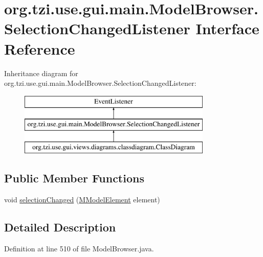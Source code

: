 \hypertarget{interfaceorg_1_1tzi_1_1use_1_1gui_1_1main_1_1_model_browser_1_1_selection_changed_listener}{\section{org.\-tzi.\-use.\-gui.\-main.\-Model\-Browser.\-Selection\-Changed\-Listener Interface Reference}
\label{interfaceorg_1_1tzi_1_1use_1_1gui_1_1main_1_1_model_browser_1_1_selection_changed_listener}
}
Inheritance diagram for org.\-tzi.\-use.\-gui.\-main.\-Model\-Browser.\-Selection\-Changed\-Listener\-:\begin{figure}[H]
\begin{center}
\leavevmode
\includegraphics[height=3.000000cm]{interfaceorg_1_1tzi_1_1use_1_1gui_1_1main_1_1_model_browser_1_1_selection_changed_listener}
\end{center}
\end{figure}
\subsection*{Public Member Functions}
\begin{DoxyCompactItemize}
\item 
void \hyperlink{interfaceorg_1_1tzi_1_1use_1_1gui_1_1main_1_1_model_browser_1_1_selection_changed_listener_a3ae90859474c029367b18ccb555adc14}{selection\-Changed} (\hyperlink{interfaceorg_1_1tzi_1_1use_1_1uml_1_1mm_1_1_m_model_element}{M\-Model\-Element} element)
\end{DoxyCompactItemize}


\subsection{Detailed Description}


Definition at line 510 of file Model\-Browser.\-java.




